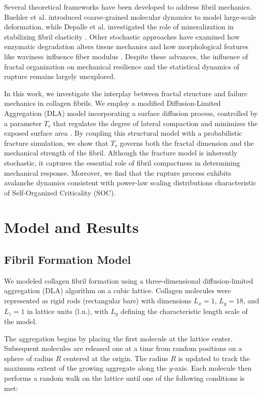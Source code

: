 \documentclass[aps,physrev,preprint,groupedaddress,linenumbers]{revtex4-2}
\begin{document}
Several theoretical frameworks have been developed to address fibril mechanics. Buehler et al. introduced coarse-grained molecular dynamics to model large-scale deformation, while Depalle et al. investigated the role of mineralization in stabilizing fibril elasticity \cite{Buehler2006a,Buehler2006b,Buehler2008a,Buehler2008b,Depalle2016}. Other stochastic approaches have examined how enzymatic degradation alters tissue mechanics \cite{Arau2011} and how morphological features like waviness influence fiber modulus \cite{Deng2024}. Despite these advances, the influence of fractal organization on mechanical resilience and the statistical dynamics of rupture remains largely unexplored.

In this work, we investigate the interplay between fractal structure and failure mechanics in collagen fibrils. We employ a modified Diffusion-Limited Aggregation (DLA) model incorporating a surface diffusion process, controlled by a parameter $T_s$ that regulates the degree of lateral compaction and minimizes the exposed surface area \cite{Parkinson1995}. By coupling this structural model with a probabilistic fracture simulation, we show that $T_s$ governs both the fractal dimension and the mechanical strength of the fibril. Although the fracture model is inherently stochastic, it captures the essential role of fibril compactness in determining mechanical response. Moreover, we find that the rupture process exhibits avalanche dynamics consistent with power-law scaling distributions characteristic of Self-Organized Criticality (SOC).

\section{Model and Results}
\subsection{Fibril Formation Model}

We modeled collagen fibril formation using a three-dimensional diffusion-limited aggregation (DLA) algorithm on a cubic lattice. Collagen molecules were represented as rigid rods (rectangular bars) with dimensions $L_x = 1$, $L_y = 18$, and $L_z = 1$ in lattice units (l.u.), with $L_y$ defining the characteristic length scale of the model.

The aggregation begins by placing the first molecule at the lattice center. Subsequent molecules are released one at a time from random positions on a sphere of radius $R$ centered at the origin. The radius $R$ is updated to track the maximum extent of the growing aggregate along the $y$-axis. Each molecule then performs a random walk on the lattice until one of the following conditions is met:
\end{document}
